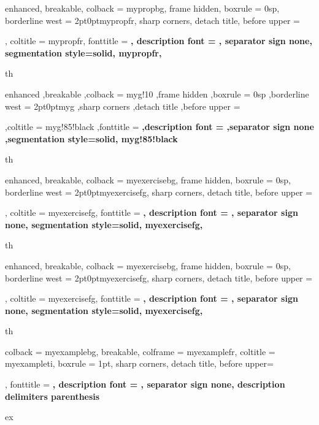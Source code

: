 {%
  enhanced,
  breakable,
  colback = mypropbg,
  frame hidden,
  boxrule = 0sp,
  borderline west = {2pt}{0pt}{mypropfr},
  sharp corners,
  detach title,
  before upper = \tcbtitle\par\smallskip,
  coltitle = mypropfr,
  fonttitle = \bfseries\sffamily,
  description font = \mdseries,
  separator sign none,
  segmentation style={solid, mypropfr},
}
{th}



{%
  enhanced
  ,breakable
  ,colback = myg!10
  ,frame hidden
  ,boxrule = 0sp
  ,borderline west = {2pt}{0pt}{myg}
  ,sharp corners
  ,detach title
  ,before upper = \tcbtitle\par\smallskip
  ,coltitle = myg!85!black
  ,fonttitle = \bfseries\sffamily
  ,description font = \mdseries
  ,separator sign none
  ,segmentation style={solid, myg!85!black}
}
{th}




{%
  enhanced,
  breakable,
  colback = myexercisebg,
  frame hidden,
  boxrule = 0sp,
  borderline west = {2pt}{0pt}{myexercisefg},
  sharp corners,
  detach title,
  before upper = \tcbtitle\par\smallskip,
  coltitle = myexercisefg,
  fonttitle = \bfseries\sffamily,
  description font = \mdseries,
  separator sign none,
  segmentation style={solid, myexercisefg},
}
{th}

{%
  enhanced,
  breakable,
  colback = myexercisebg,
  frame hidden,
  boxrule = 0sp,
  borderline west = {2pt}{0pt}{myexercisefg},
  sharp corners,
  detach title,
  before upper = \tcbtitle\par\smallskip,
  coltitle = myexercisefg,
  fonttitle = \bfseries\sffamily,
  description font = \mdseries,
  separator sign none,
  segmentation style={solid, myexercisefg},
}
{th}


{%
  colback = myexamplebg,
  breakable,
  colframe = myexamplefr,
  coltitle = myexampleti,
  boxrule = 1pt,
  sharp corners,
  detach title,
  before upper=\tcbtitle\par\smallskip,
  fonttitle = \sffamily\bfseries,
  description font = \mdseries,
  separator sign none,
  description delimiters parenthesis
}
{ex}

